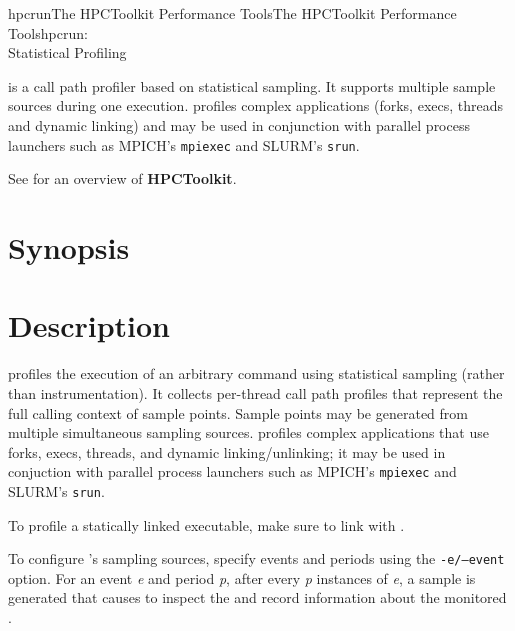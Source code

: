 \documentclass[english]{article}
\begin{document}
\begin{Name}{1}{hpcrun}{The HPCToolkit Performance Tools}{The HPCToolkit Performance Tools}{hpcrun:\\ Statistical Profiling}

 is a call path profiler based on statistical sampling.
It supports multiple sample sources during one execution.
 profiles complex applications (forks, execs, threads and dynamic linking) and may be used in conjunction with parallel process launchers such as MPICH's \texttt{mpiexec} and SLURM's \texttt{srun}.

See  for an overview of \textbf{HPCToolkit}.


\end{Name}

\section{Synopsis}

   

 

\section{Description}

 profiles the execution of an arbitrary command  using statistical sampling (rather than instrumentation).
It collects per-thread call path profiles that represent the full calling context of sample points.
Sample points may be generated from multiple simultaneous sampling sources.
 profiles complex applications that use forks, execs, threads, and dynamic linking/unlinking; it may be used in conjuction with parallel process launchers such as MPICH's \texttt{mpiexec} and SLURM's \texttt{srun}.

To profile a statically linked executable, make sure to link with .

To configure 's sampling sources, specify events and periods using the \texttt{-e/--event} option.
For an event \emph{e} and period \emph{p}, after every \emph{p} instances of \emph{e}, a sample is generated that causes  to inspect the and record information about the monitored .
\end{document}
